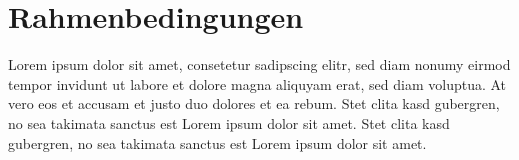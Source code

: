 \section{Rahmenbedingungen}\label{Rahmenbedingungen}

Lorem ipsum dolor sit amet, consetetur sadipscing elitr, sed diam nonumy eirmod tempor invidunt ut labore et dolore magna aliquyam erat, sed diam voluptua. At vero eos et accusam et justo duo dolores et ea rebum. Stet clita kasd gubergren, no sea takimata sanctus est Lorem ipsum dolor sit amet. Stet clita kasd gubergren, no sea takimata sanctus est Lorem ipsum dolor sit amet.







